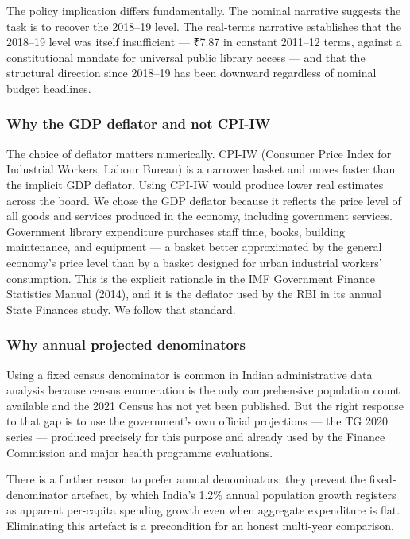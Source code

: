 \documentclass[
  11pt,
  oneside,
  10pt,
  a4paper,
  twocolumn]{article}
\begin{document}
The policy implication differs fundamentally. The nominal narrative
suggests the task is to recover the 2018--19 level. The real-terms
narrative establishes that the 2018--19 level was itself insufficient
--- ₹7.87 in constant 2011--12 terms, against a constitutional mandate
for universal public library access --- and that the structural
direction since 2018--19 has been downward regardless of nominal budget
headlines.

\subsubsection{Why the GDP deflator and not
CPI-IW}\label{why-the-gdp-deflator-and-not-cpi-iw}

The choice of deflator matters numerically. CPI-IW (Consumer Price Index
for Industrial Workers, Labour Bureau) is a narrower basket and moves
faster than the implicit GDP deflator. Using CPI-IW would produce lower
real estimates across the board. We chose the GDP deflator because it
reflects the price level of all goods and services produced in the
economy, including government services. Government library expenditure
purchases staff time, books, building maintenance, and equipment --- a
basket better approximated by the general economy's price level than by
a basket designed for urban industrial workers' consumption. This is the
explicit rationale in the IMF Government Finance Statistics Manual
(2014), and it is the deflator used by the RBI in its annual State
Finances study. We follow that standard.

\subsubsection{Why annual projected
denominators}\label{why-annual-projected-denominators}

Using a fixed census denominator is common in Indian administrative data
analysis because census enumeration is the only comprehensive population
count available and the 2021 Census has not yet been published. But the
right response to that gap is to use the government's own official
projections --- the TG 2020 series --- produced precisely for this
purpose and already used by the Finance Commission and major health
programme evaluations.

There is a further reason to prefer annual denominators: they prevent
the fixed-denominator artefact, by which India's 1.2\% annual population
growth registers as apparent per-capita spending growth even when
aggregate expenditure is flat. Eliminating this artefact is a
precondition for an honest multi-year comparison.
\end{document}
